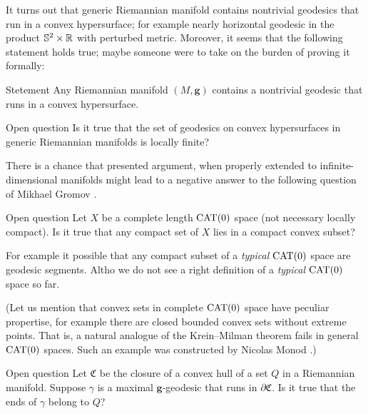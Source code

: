 \documentclass[a4paper,10pt]{article}
\begin{document}
It turns out that generic Riemannian manifold contains nontrivial geodesics that run in a convex hypersurface;
for example nearly horizontal geodesic in the product $\mathbb{S}^2\times \mathbb{R}$ with perturbed metric. 
Moreover, it seems that the following statement holds true; maybe someone were to take on the burden of proving it formally:

\begin{thm}{Stetement}
Any Riemannian manifold $(M,\bm{g})$ contains a nontrivial geodesic  that runs in a convex hypersurface.
\end{thm}


\begin{thm}{Open question}
Is it true that the set of geodesics on convex hypersurfaces in generic Riemannian manifolds is locally finite?
\end{thm}

There is a chance that presented argument, when properly extended to infinite-dimensional manifolds might lead to a negative answer to the following question of Mikhael Gromov \cite[6.B\textsubscript{1}(f)]{gromov-1993}.

\begin{thm}{Open question}
Let $X$ be a complete length $\operatorname{\rm CAT}(0)$ space (not necessary locally compact).
Is it true that any compact set of $X$ lies in a compact convex subset?
\end{thm}

For example it possible that any compact subset of a \emph{typical} $\operatorname{\rm CAT}(0)$ space are geodesic segments.
Altho we do not see a right definition of a \emph{typical} $\operatorname{\rm CAT}(0)$ space so far.

(Let us mention that convex sets in complete $\operatorname{\rm CAT}(0)$ space have peculiar propertise, for example there are closed bounded convex sets without extreme points.
That is, a  natural  analogue  of  the  Krein--Milman  theorem fails in general $\operatorname{\rm CAT}(0)$ spaces.
Such an example was constructed by Nicolas Monod \cite{monod-2016}.)

\begin{thm}{Open question}
Let $\mathfrak{C}$ be the closure of a convex hull of a set $Q$ in a Riemannian manifold.
Suppose $\gamma$ is a maximal $\bm{g}$-geodesic that runs in $\partial \mathfrak{C}$.
Is it true that the ends of $\gamma$ belong to $Q$?
\end{thm}




\end{document}
